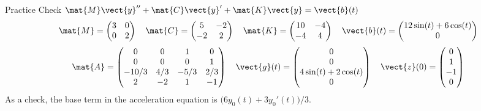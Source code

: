 \documentclass[11pt,aspectratio=169]{beamer}
\begin{document}
\begin{frame}{Practice Check \quad $\mat{M}\vect{y}''+\mat{C}\vect{y}'+\mat{K}\vect{y}=\vect{b}(t)$}
\[
  \mat{M}=\begin{pmatrix}3&0\\0&2\end{pmatrix}
  \quad
  \mat{C}=\begin{pmatrix}5&-2\\-2&2\end{pmatrix}
  \quad
  \mat{K}=\begin{pmatrix}10&-4\\-4&4\end{pmatrix}
  \quad
  \vect{b}(t)=\begin{pmatrix}12\sin(t)+6\cos(t)\\0\end{pmatrix}
\]
\[
  \mat{A}=\begin{pmatrix}
    0&0&1&0\\
    0&0&0&1\\
    -10/3&4/3&-5/3&2/3\\
    2&-2&1&-1
  \end{pmatrix}
  \quad
  \vect{g}(t)=\begin{pmatrix}0\\0\\4\sin(t)+2\cos(t)\\0\end{pmatrix}
  \quad
  \vect{z}(0)=\begin{pmatrix}0\\1\\-1\\0\end{pmatrix}
\]
As a check, the base term in the acceleration equation is
$\bigl(6y_0(t)+3y_0'(t)\bigr)/3$.
\end{frame}
\end{document}
